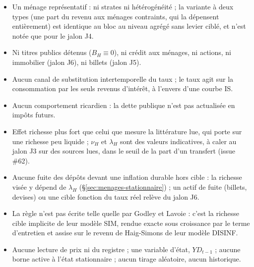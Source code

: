 \documentclass[11pt,a4paper]{article}
\begin{document}
\begin{portee}[ménages]
\begin{itemize}
\item Un ménage représentatif : ni strates ni hétérogénéité ; la variante à deux types (une part du revenu aux ménages contraints, qui la dépensent entièrement) est identique au bloc au niveau agrégé sans levier ciblé, et n'est notée que pour le jalon J4.
\item Ni titres publics détenus ($B_H \equiv 0$), ni crédit aux ménages, ni actions, ni immobilier (jalon J6), ni billets (jalon J5).
\item Aucun canal de substitution intertemporelle du taux ; le taux agit sur la consommation par les seuls revenus d'intérêt, à l'envers d'une courbe IS.
\item Aucun comportement ricardien : la dette publique n'est pas actualisée en impôts futurs.
\item Effet richesse plus fort que celui que mesure la littérature lue, qui porte sur une richesse peu liquide ; $\nu_H$ et $\lambda_H$ sont des valeurs indicatives, à caler au jalon J3 sur des sources lues, dans le seuil de la part d'un transfert (issue \#62).
\item Aucune fuite des dépôts devant une inflation durable hors cible : la richesse visée y dépend de $\lambda_H$ (\S\ref{sec:menages-stationnaire}) ; un actif de fuite (billets, devises) ou une cible fonction du taux réel relève du jalon J6.
\item La règle n'est pas écrite telle quelle par Godley et Lavoie : c'est la richesse cible implicite de leur modèle SIM, rendue exacte sous croissance par le terme d'entretien et assise sur le revenu de Haig-Simons de leur modèle DISINF.
\item Aucune lecture de prix ni du registre ; une variable d'état, $\mathit{YD}_{t-1}$ ; aucune borne active à l'état stationnaire ; aucun tirage aléatoire, aucun historique.
\end{itemize}
\end{portee}

\end{document}
